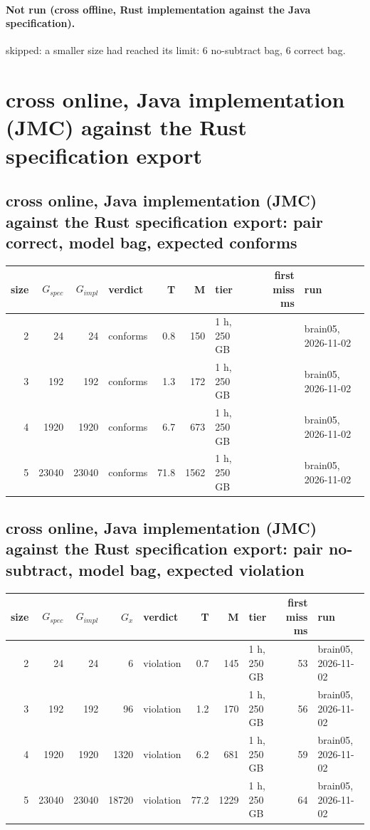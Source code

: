 \documentclass[10pt]{article}
\begin{document}
\paragraph{Not run (cross offline, Rust implementation against the Java specification).}
skipped: a smaller size had reached its limit: 6 no-subtract bag, 6 correct bag.\par
\section*{cross online, Java implementation (JMC) against the Rust specification export}
\subsection*{cross online, Java implementation (JMC) against the Rust specification export: pair \textsf{correct}, model bag, expected conforms}
\begin{longtable}{@{}rrrlrrlrl@{}}
\toprule
size & $G_{\mathit{spec}}$ & $G_{\mathit{impl}}$ & verdict & T & M & tier & first miss ms & run \\
\midrule
\endhead
\color{red} 2 & 24 & 24 & conforms & 0.8 & 150 & 1 h, 250 GB &  & brain05, 2026-11-02 \\
\color{red} 3 & 192 & 192 & conforms & 1.3 & 172 & 1 h, 250 GB &  & brain05, 2026-11-02 \\
\color{red} 4 & 1920 & 1920 & conforms & 6.7 & 673 & 1 h, 250 GB &  & brain05, 2026-11-02 \\
\color{red} 5 & 23040 & 23040 & conforms & 71.8 & 1562 & 1 h, 250 GB &  & brain05, 2026-11-02 \\
\bottomrule
\end{longtable}
\subsection*{cross online, Java implementation (JMC) against the Rust specification export: pair \textsf{no-subtract}, model bag, expected violation}
\begin{longtable}{@{}rrrrlrrlrl@{}}
\toprule
size & $G_{\mathit{spec}}$ & $G_{\mathit{impl}}$ & $G_x$ & verdict & T & M & tier & first miss ms & run \\
\midrule
\endhead
\color{red} 2 & 24 & 24 & 6 & violation & 0.7 & 145 & 1 h, 250 GB & 53 & brain05, 2026-11-02 \\
\color{red} 3 & 192 & 192 & 96 & violation & 1.2 & 170 & 1 h, 250 GB & 56 & brain05, 2026-11-02 \\
\color{red} 4 & 1920 & 1920 & 1320 & violation & 6.2 & 681 & 1 h, 250 GB & 59 & brain05, 2026-11-02 \\
\color{red} 5 & 23040 & 23040 & 18720 & violation & 77.2 & 1229 & 1 h, 250 GB & 64 & brain05, 2026-11-02 \\
\bottomrule
\end{longtable}
\end{document}

